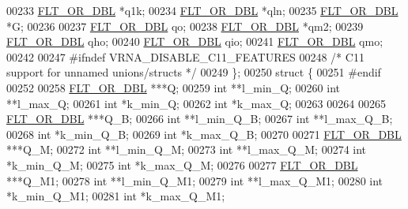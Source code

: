 \begin{DoxyCode}
00233       \hyperlink{group__data__structures_ga31125aeace516926bf7f251f759b6126}{FLT\_OR\_DBL}  *q1k;
00234       \hyperlink{group__data__structures_ga31125aeace516926bf7f251f759b6126}{FLT\_OR\_DBL}  *qln;
00235       \hyperlink{group__data__structures_ga31125aeace516926bf7f251f759b6126}{FLT\_OR\_DBL}  *G;
00236 
00237       \hyperlink{group__data__structures_ga31125aeace516926bf7f251f759b6126}{FLT\_OR\_DBL}  qo;
00238       \hyperlink{group__data__structures_ga31125aeace516926bf7f251f759b6126}{FLT\_OR\_DBL}  *qm2;
00239       \hyperlink{group__data__structures_ga31125aeace516926bf7f251f759b6126}{FLT\_OR\_DBL}  qho;
00240       \hyperlink{group__data__structures_ga31125aeace516926bf7f251f759b6126}{FLT\_OR\_DBL}  qio;
00241       \hyperlink{group__data__structures_ga31125aeace516926bf7f251f759b6126}{FLT\_OR\_DBL}  qmo;
00242 
00247 \textcolor{preprocessor}{#ifndef VRNA\_DISABLE\_C11\_FEATURES}
00248     \textcolor{comment}{/* C11 support for unnamed unions/structs */}
00249     \};
00250     \textcolor{keyword}{struct }\{
00251 \textcolor{preprocessor}{#endif}
00252 
00258       \hyperlink{group__data__structures_ga31125aeace516926bf7f251f759b6126}{FLT\_OR\_DBL}      ***Q;
00259       \textcolor{keywordtype}{int}             **l\_min\_Q;
00260       \textcolor{keywordtype}{int}             **l\_max\_Q;
00261       \textcolor{keywordtype}{int}             *k\_min\_Q;
00262       \textcolor{keywordtype}{int}             *k\_max\_Q;
00263 
00264 
00265       \hyperlink{group__data__structures_ga31125aeace516926bf7f251f759b6126}{FLT\_OR\_DBL}      ***Q\_B;
00266       \textcolor{keywordtype}{int}             **l\_min\_Q\_B;
00267       \textcolor{keywordtype}{int}             **l\_max\_Q\_B;
00268       \textcolor{keywordtype}{int}             *k\_min\_Q\_B;
00269       \textcolor{keywordtype}{int}             *k\_max\_Q\_B;
00270 
00271       \hyperlink{group__data__structures_ga31125aeace516926bf7f251f759b6126}{FLT\_OR\_DBL}      ***Q\_M;
00272       \textcolor{keywordtype}{int}             **l\_min\_Q\_M;
00273       \textcolor{keywordtype}{int}             **l\_max\_Q\_M;
00274       \textcolor{keywordtype}{int}             *k\_min\_Q\_M;
00275       \textcolor{keywordtype}{int}             *k\_max\_Q\_M;
00276 
00277       \hyperlink{group__data__structures_ga31125aeace516926bf7f251f759b6126}{FLT\_OR\_DBL}      ***Q\_M1;
00278       \textcolor{keywordtype}{int}             **l\_min\_Q\_M1;
00279       \textcolor{keywordtype}{int}             **l\_max\_Q\_M1;
00280       \textcolor{keywordtype}{int}             *k\_min\_Q\_M1;
00281       \textcolor{keywordtype}{int}             *k\_max\_Q\_M1;

\end{DoxyCode}
